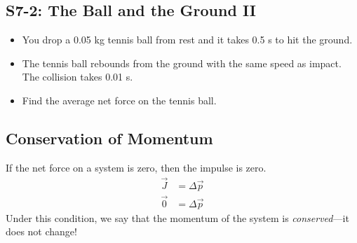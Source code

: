 \documentclass[]{article}
\begin{document}
\begin{PresentSpace}
\vspace{-10pt}
\section*{S7-2: The Ball and the Ground II}
\vspace{-10pt}
\begin{itemize}
	\item  You drop a 0.05 kg tennis ball from rest and it takes 0.5 s to hit the ground.
	\item The tennis ball rebounds from the ground with the same speed as impact. The collision takes 0.01 s.
	\item Find the average net force on the tennis ball.
\end{itemize}
\end{PresentSpace}
\newpage
\begin{TeacherMargin}

\end{TeacherMargin}
\begin{PresentSpace}
\vspace{-10pt}
\section*{Conservation of Momentum}
\vspace{-5pt}
If the net force on a system is zero, then the impulse is zero.
\begin{align*}
	\vec{J} & = \Delta\vec{p} \\
	\vec{0} & = \Delta\vec{p}
\end{align*}
Under this condition, we say that the momentum of the system is \textit{conserved}---it does not change!
\end{PresentSpace}
\newpage
\begin{TeacherMargin}
\CollRockConsSol
\CollRocksSpecSol
\end{TeacherMargin}
\end{document}
